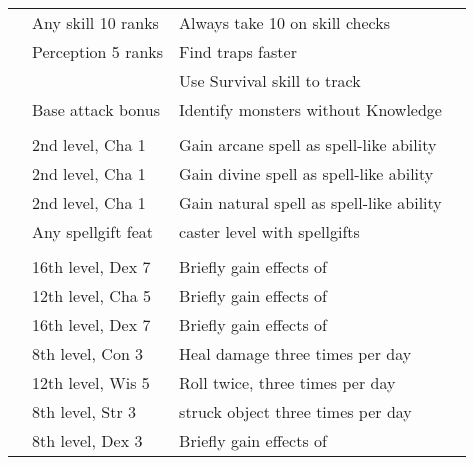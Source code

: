 {\begin{longtabu}{>{\lcol}p{10em} >{\lcol}p{15em} >{\lcol}X >{\lcol}p{3em}}
     & Any skill 10 ranks & Always take 10 on skill checks &  \\
     & Perception 5 ranks & Find traps faster &  \\
     & \x &  Use Survival skill to track &  \\
     & Base attack bonus  & Identify monsters without Knowledge &  \\

    \midrule
     &  &  &  \\
     & 2nd level, Cha 1 & Gain arcane spell as spell-like ability &  \\
     & 2nd level, Cha 1 & Gain divine spell as spell-like ability &  \\
     & 2nd level, Cha 1 & Gain natural spell as spell-like ability &  \\
     & Any spellgift feat &  caster level with spellgifts &  \\

    \midrule
     &  &  &  \\
     & 16th level, Dex 7 & Briefly gain effects of  &  \\
     & 12th level, Cha 5 & Briefly gain effects of  &  \\
     & 16th level, Dex 7 & Briefly gain effects of  &  \\
     & 8th level, Con 3 & Heal damage three times per day &  \\
     & 12th level, Wis 5 & Roll twice, three times per day &  \\
     & 8th level, Str 3 &  struck object three times per day &  \\
     & 8th level, Dex 3 & Briefly gain effects of  &  \\
\end{longtabu}}

